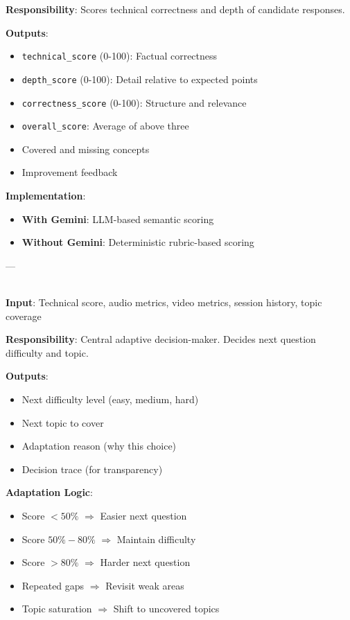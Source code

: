 \documentclass[11pt]{article}
\begin{document}
\begin{description}[leftmargin=3cm, style=nextline]
  \textbf{Responsibility}: Scores technical correctness and depth of candidate responses.

  \textbf{Outputs}:
  \begin{itemize}
    \item \texttt{technical\_score} (0-100): Factual correctness
    \item \texttt{depth\_score} (0-100): Detail relative to expected points
    \item \texttt{correctness\_score} (0-100): Structure and relevance
    \item \texttt{overall\_score}: Average of above three
    \item Covered and missing concepts
    \item Improvement feedback
  \end{itemize}

  \textbf{Implementation}:
  \begin{itemize}
    \item \textbf{With Gemini}: LLM-based semantic scoring
    \item \textbf{Without Gemini}: Deterministic rubric-based scoring
  \end{itemize}

  ---

  \item[\textbf{intelligence\_engine}]
  \hfill \\
  \textbf{Input}: Technical score, audio metrics, video metrics, session history, topic coverage

  \textbf{Responsibility}: Central adaptive decision-maker. Decides next question difficulty and topic.

  \textbf{Outputs}:
  \begin{itemize}
    \item Next difficulty level (easy, medium, hard)
    \item Next topic to cover
    \item Adaptation reason (why this choice)
    \item Decision trace (for transparency)
  \end{itemize}

  \textbf{Adaptation Logic}:
  \begin{itemize}
    \item Score $< 50\%$ $\Rightarrow$ Easier next question
    \item Score $50\%-80\%$ $\Rightarrow$ Maintain difficulty
    \item Score $> 80\%$ $\Rightarrow$ Harder next question
    \item Repeated gaps $\Rightarrow$ Revisit weak areas
    \item Topic saturation $\Rightarrow$ Shift to uncovered topics
  \end{itemize}


\end{description}
\end{document}
